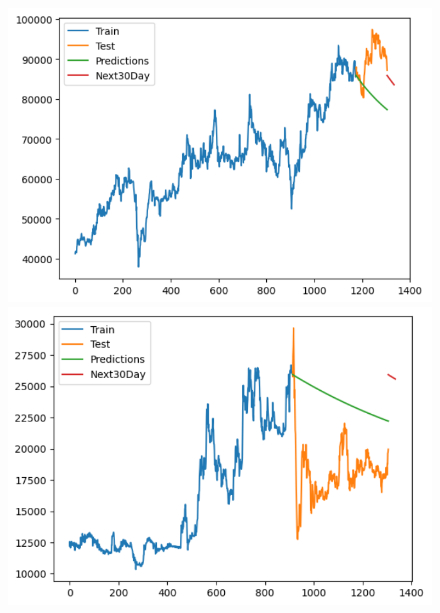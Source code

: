 \begin{figure}[H]
\begin{minipage}{0.15\textwidth}
    \end{minipage}
    \hfill
        \begin{minipage}{0.15\textwidth}
    \centering
    \includegraphics[width=1\textwidth]{resources/chapter-5/newdata/result/VCB_VARMA_9-1.png}
    \end{minipage}
    \hfill
    \begin{minipage}{0.15\textwidth}
    \centering
    \includegraphics[width=1\textwidth]{resources/chapter-5/newdata/result/EIB_VARMA_7-3.png}
    \end{minipage}
    \hfill
    \begin{minipage}{0.15\textwidth}
    \centering

\end{minipage}
\end{figure}
